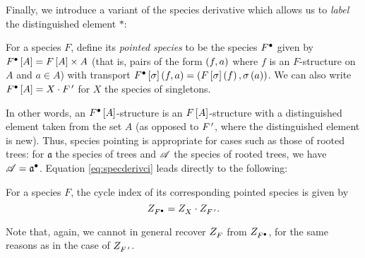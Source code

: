 \documentclass[sectionflow,singlespace,twoside,boldmathhdr,draft]{brandiss} %
\numberwithin{section}{chapter}
\numberwithin{figure}{chapter}
\begin{document}
Finally, we introduce a variant of the species derivative which allows us to \emph{label} the distinguished element $*$:
\begin{definition}
  \label{def:specpoint}
  For a species $F$, define its \emph{pointed species} to be the species $ {F}^{\bullet } $ given by $ {F}^{\bullet }  \left[ {A} \right] = F \left[ {A} \right] \times A$ (that is, pairs of the form $\left( {f, a} \right)$ where $f$ is an $F$-structure on $A$ and $a \in A$) with transport $ {F}^{\bullet }  \left[ {\sigma} \right] \left( {f, a} \right) = \left( {F \left[ {\sigma} \right] \left( {f} \right), \sigma \left( {a} \right)} \right)$.
  We can also write $ {F}^{\bullet }  \left[ {A} \right] = X \cdot  {F}^{\,\prime } $ for $X$ the species of singletons.
\end{definition}
In other words, an $ {F}^{\bullet }  \left[ {A} \right]$-structure is an $F \left[ {A} \right]$-structure with a distinguished element taken from the set $A$ (as opposed to $ {F}^{\,\prime } $, where the distinguished element is new).
Thus, species pointing is appropriate for cases such as those of rooted trees: for $\mathfrak{a}$ the species of trees and $\mathscr{A}$ the species of rooted trees, we have $\mathscr{A} =  {\mathfrak{a}}^{\bullet } $.
Equation \eqref{eq:specderivci} leads directly to the following:
\begin{theorem}
  \label{thm:specpointci}
  For a species $F$, the cycle index of its corresponding pointed species is given by
  \begin{equation}
    \label{eq:specpointci}
     Z_{ {F}^{\bullet } }^{}  =  Z_{X}^{}  \cdot  Z_{ {F}^{\,\prime } }^{} .
  \end{equation}
\end{theorem}
Note that, again, we cannot in general recover $ Z_{F}^{} $ from $ Z_{ {F}^{\bullet } }^{} $, for the same reasons as in the case of $ Z_{ {F}^{\,\prime } }^{} $.
\end{document}
